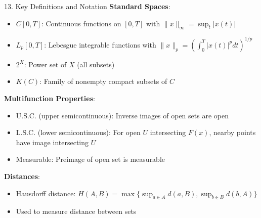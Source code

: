 \documentclass[aspectratio=169,10pt]{beamer}
\begin{document}
\begin{frame}[allowframebreaks]{13. Key Definitions and Notation}
    \textbf{Standard Spaces}:
    \begin{itemize}
        \item $C[0,T]$: Continuous functions on $[0,T]$ with $\|x\|_\infty = \sup_{t} |x(t)|$
        \item $L_p[0,T]$: Lebesgue integrable functions with $\|x\|_p = \left(\int_0^T |x(t)|^p dt\right)^{1/p}$
        \item $2^X$: Power set of $X$ (all subsets)
        \item $K(C)$: Family of nonempty compact subsets of $C$
    \end{itemize}

    \vspace{0.3cm}
    \textbf{Multifunction Properties}:
    \begin{itemize}
        \item U.S.C. (upper semicontinuous): Inverse images of open sets are open
        \item L.S.C. (lower semicontinuous): For open $U$ intersecting $F(x)$, nearby points have image intersecting $U$
        \item Measurable: Preimage of open set is measurable
    \end{itemize}

    \vspace{0.3cm}
    \textbf{Distances}:
    \begin{itemize}
        \item Hausdorff distance: $H(A,B) = \max\{\sup_{a \in A} d(a,B), \sup_{b \in B} d(b,A)\}$
        \item Used to measure distance between sets
    \end{itemize}
\end{frame}
\end{document}
